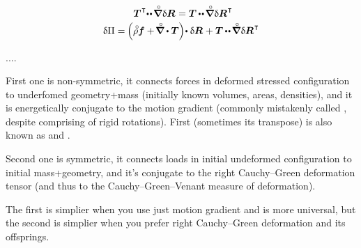 \begin{equation*}
\begin{array}{c}
\:\,
\firstpiolakirchhoffstress^{\hspace{.1ex}\T} \hspace{-0.5ex} \dotdotp \hspace{-0.2ex} \boldnablacircled \hspace{.1ex} \variation{\bm{R}} \hspace{.1ex}
= \firstpiolakirchhoffstress \hspace{-0.1ex} \dotdotp \hspace{-0.2ex} \boldnablacircled \hspace{.1ex} \variation{\bm{R}}^{\hspace{0.12ex}\T} \\[.25em]
%
\variation{\Pi}
= \hspace{-0.16ex} \left(^{\mathstrut} \hspace{-0.1ex} \mathcircabove{\rho} \bm{f} + \hspace{-0.25ex} \boldnablacircled \dotp \firstpiolakirchhoffstress \right) \hspace{-0.4ex} \dotp \variation{\bm{R}}
\hspace{.1ex}
+ \firstpiolakirchhoffstress \hspace{-0.1ex} \dotdotp \hspace{-0.2ex} \boldnablacircled \hspace{.1ex} \variation{\bm{R}}^{\hspace{0.12ex}\T}
\end{array}
\end{equation*}



....


First one is non-symmetric, it connects forces in deformed stressed configuration to underfomed geometry+mass (initially known volumes, areas, densities), and it is energetically conjugate to the motion gradient (commonly mistakenly called , despite comprising of rigid rotations). First (sometimes its transpose) is also known as  and .

Second one is symmetric, it connects loads in initial undeformed configuration to initial mass+geometry, and it’s conjugate to the right Cauchy\hbox{--}Green deformation tensor (and thus to the Cauchy\hbox{--}Green\hbox{--}Venant measure of deformation).

The first is simplier when you use just motion gradient and is more universal, but the second is simplier when you prefer right Cauchy\hbox{--}Green deformation and its offsprings.

